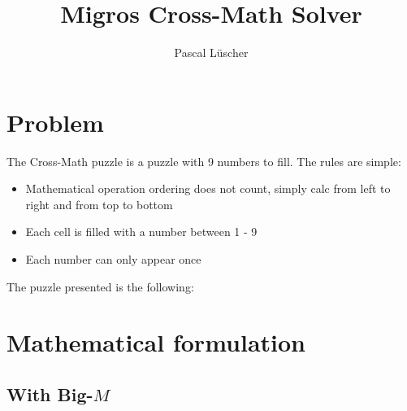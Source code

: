 \documentclass[parskip=half]{scrartcl}
\title{Migros Cross-Math Solver}
\author{Pascal Lüscher}
\newcommand{\rect}[4]{\draw[fill=#4] (#1 cm, #2 cm) rectangle (#1 cm + 1 cm, #2 cm - 1 cm) node[pos=.5] {#3};}
\newcommand{\wsq}[3]{\rect{#1}{#2}{#3}{white}}
\newcommand{\bsq}[2]{\rect{#1}{#2}{}{gray}}
\newcommand{\ysq}[2]{\rect{#1}{#2}{}{yellow!10}}
\begin{document}
\maketitle

\section{Problem}
The Cross-Math puzzle is a puzzle with 9 numbers to fill.
The rules are simple:
\begin{itemize}
	\item Mathematical operation ordering does not count, simply calc from left to right and from top to bottom
	\item Each cell is filled with a number between 1 - 9
	\item Each number can only appear once
\end{itemize}

The puzzle presented is the following:
\begin{center}
\end{center}


\section{Mathematical formulation}
\subsection{With Big-$M$}
\end{document}
